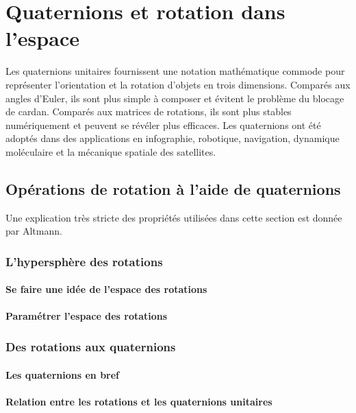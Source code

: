 
\chapter{Quaternions et rotation dans l'espace}
Les quaternions unitaires fournissent une notation mathématique commode pour représenter l'orientation et la rotation d'objets en trois dimensions. Comparés aux angles d'Euler, ils sont plus simple à composer et évitent le problème du blocage de cardan. Comparés aux matrices de rotations, ils sont plus stables numériquement et peuvent se révéler plus efficaces. Les quaternions ont été adoptés dans des applications en infographie, robotique, navigation, dynamique moléculaire et la mécanique spatiale des satellites.

\section{Opérations de rotation à l'aide de quaternions}
Une explication très stricte des propriétés utilisées dans cette section est donnée par Altmann\label{Altmann}.

	\subsection{L'hypersphère des rotations}
		\subsubsection{Se faire une idée de l'espace des rotations}
			
		\subsubsection{Paramétrer l'espace des rotations}
			
	\subsection{Des rotations aux quaternions}
		\subsubsection{Les quaternions en bref}
			
		\subsubsection{Relation entre les rotations et les quaternions unitaires}
			
